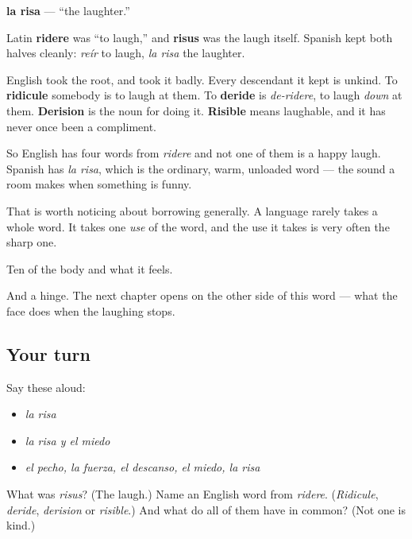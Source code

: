 \begin{cousinweb}
\textbf{la risa} — \textquotedblleft{}the laughter.\textquotedblright{}

Latin \textbf{ridere} was \textquotedblleft{}to laugh,\textquotedblright{} and \textbf{risus} was the laugh itself. Spanish kept both halves cleanly: \emph{reír} to laugh, \emph{la risa} the laughter.

English took the root, and took it badly. Every descendant it kept is unkind. To \textbf{ridicule} somebody is to laugh at them. To \textbf{deride} is \emph{de-ridere}, to laugh \emph{down} at them. \textbf{Derision} is the noun for doing it. \textbf{Risible} means laughable, and it has never once been a compliment.

So English has four words from \emph{ridere} and not one of them is a happy laugh. Spanish has \emph{la risa}, which is the ordinary, warm, unloaded word — the sound a room makes when something is funny.

That is worth noticing about borrowing generally. A language rarely takes a whole word. It takes one \emph{use} of the word, and the use it takes is very often the sharp one.
\end{cousinweb}

\begin{grammarlens}[title={What you've built}]
Ten of the body and what it feels.

And a hinge. The next chapter opens on the other side of this word — what the face does when the laughing stops.
\end{grammarlens}

\subsection*{Your turn}
Say these aloud:

\begin{itemize}
\raggedright
  \item \emph{la risa}
  \item \emph{la risa y el miedo}
  \item \emph{el pecho, la fuerza, el descanso, el miedo, la risa}
\end{itemize}

\begin{tcolorbox}[breakable,colback=teal!4,colframe=teal!35!black,title={Before you move on}]
What was \emph{risus}? (The laugh.) Name an English word from \emph{ridere}. (\emph{Ridicule}, \emph{deride}, \emph{derision} or \emph{risible}.) And what do all of them have in common? (Not one is kind.)
\end{tcolorbox}
